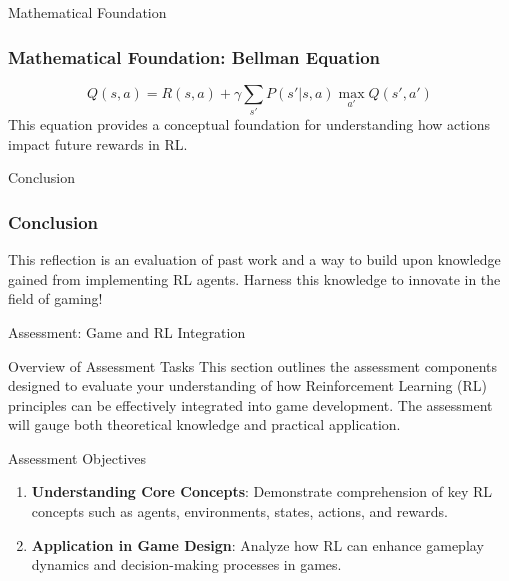 \documentclass[aspectratio=169]{beamer}
\begin{document}
\begin{frame}[fragile]{Mathematical Foundation}
    \frametitle{Mathematical Foundation: Bellman Equation}
    \begin{equation}
        Q(s, a) = R(s, a) + \gamma \sum_{s'} P(s'|s, a) \max_{a'} Q(s', a')
    \end{equation}
    This equation provides a conceptual foundation for understanding how actions impact future rewards in RL.
\end{frame}

\begin{frame}[fragile]{Conclusion}
    \frametitle{Conclusion}
    This reflection is an evaluation of past work and a way to build upon knowledge gained from implementing RL agents. Harness this knowledge to innovate in the field of gaming!
\end{frame}

\begin{frame}[fragile]{Assessment: Game and RL Integration}
    \begin{block}{Overview of Assessment Tasks}
        This section outlines the assessment components designed to evaluate your understanding of how Reinforcement Learning (RL) principles can be effectively integrated into game development. The assessment will gauge both theoretical knowledge and practical application.
    \end{block}
\end{frame}

\begin{frame}[fragile]{Assessment Objectives}
    \begin{enumerate}
        \item \textbf{Understanding Core Concepts}: Demonstrate comprehension of key RL concepts such as agents, environments, states, actions, and rewards.
        \item \textbf{Application in Game Design}: Analyze how RL can enhance gameplay dynamics and decision-making processes in games.
    \end{enumerate}
\end{frame}
\end{document}
